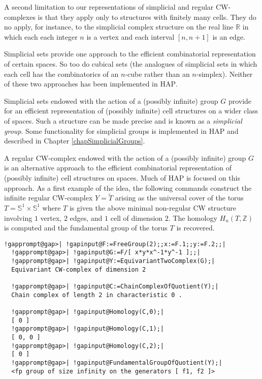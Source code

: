\documentclass[a4paper,11pt]{report}
\begin{document}
{{  

  

A second limitation to our representations of simplicial and regular
CW-complexes is that they apply only to structures with finitely many cells.
They do no apply, for instance, to the simplicial complex structure on the
real line $\mathbb R$ in which each each integer $n$ is a vertex and each interval $[n,n+1]$ is an edge. 

 Simplicial sets provide one approach to the efficient combinatorial
representation of certain spaces. So too do cubical sets (the analogues of
simplicial sets in which each cell has the combinatorics of an $n$-cube rather than an $n$-simplex). Neither of these two approaches has been implemented in \textsc{HAP}. 

 Simplicial sets endowed with the action of a (possibly infinite) group $G$ provide for an efficient representation of (possibly infinite) cell structures
on a wider class of spaces. Such a structure can be made precise and is known
as a \emph{simplicial group}. Some functionality for simplicial groups is implemented in \textsc{HAP} and described in Chapter \ref{chapSimplicialGroups}. 

A regular CW-complex endowed with the action of a (possibly infinite) group $G$ is an alternative approach to the efficient combinatorial representation of
(possibly infinite) cell structures on spaces. Much of \textsc{HAP} is focused on this approach. As a first example of the idea, the following
commands construct the infinite regular CW-complex $Y=\widetilde T$ arising as the universal cover of the torus $T=\mathbb S^1\times \mathbb S^1$ where $T$ is given the above minimal non-regular CW structure involving $1$ vertex, $2$ edges, and $1$ cell of dimension $2$. The homology $H_n(T,\mathbb Z)$ is computed and the fundamental group of the torus $T$ is recovered. 
\begin{Verbatim}[commandchars=!@|,fontsize=\small,frame=single,label=Example]
  !gapprompt@gap>| !gapinput@F:=FreeGroup(2);;x:=F.1;;y:=F.2;;|
  !gapprompt@gap>| !gapinput@G:=F/[ x*y*x^-1*y^-1 ];;|
  !gapprompt@gap>| !gapinput@Y:=EquivariantTwoComplex(G);|
  Equivariant CW-complex of dimension 2
  
  !gapprompt@gap>| !gapinput@C:=ChainComplexOfQuotient(Y);|
  Chain complex of length 2 in characteristic 0 . 
  
  !gapprompt@gap>| !gapinput@Homology(C,0);|
  [ 0 ]
  !gapprompt@gap>| !gapinput@Homology(C,1);|
  [ 0, 0 ]
  !gapprompt@gap>| !gapinput@Homology(C,2);|
  [ 0 ]
  !gapprompt@gap>| !gapinput@FundamentalGroupOfQuotient(Y);|
  <fp group of size infinity on the generators [ f1, f2 ]>
  

\end{Verbatim}}}
\end{document}
